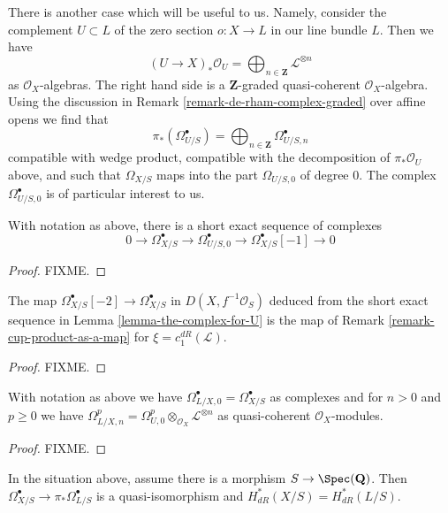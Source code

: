 \medskip\noindent
There is another case which will be useful to us. Namely, consider the
complement $U \subset L$ of the zero section $o : X \to L$ in our line
bundle $L$. Then we have
$$
(U \to X)_*\mathcal{O}_U =
\bigoplus\nolimits_{n \in \mathbf{Z}} \mathcal{L}^{\otimes n}
$$
as $\mathcal{O}_X$-algebras. The right hand side is a $\mathbf{Z}$-graded
quasi-coherent $\mathcal{O}_X$-algebra. Using the discussion in
Remark \ref{remark-de-rham-complex-graded} over affine opens we find that
$$
\pi_*(\Omega^\bullet_{U/S}) =
\bigoplus\nolimits_{n \in \mathbf{Z}} \Omega^\bullet_{U/S, n}
$$
compatible with wedge product, compatible with the decomposition
of $\pi_*\mathcal{O}_U$ above, and such that $\Omega_{X/S}$
maps into the part $\Omega_{U/S, 0}$ of degree $0$.
The complex $\Omega^\bullet_{U/S, 0}$ is of particular interest to us.

\begin{lemma}
\label{lemma-the-complex-for-U}
With notation as above, there is a short exact sequence of complexes
$$
0 \to \Omega^\bullet_{X/S} \to
\Omega^\bullet_{U/S, 0} \to
\Omega^\bullet_{X/S}[-1] \to 0
$$
\end{lemma}

\begin{proof}
FIXME.
\end{proof}

\begin{lemma}
\label{lemma-the-complex-for-U-gives-chern-class}
The map $\Omega^\bullet_{X/S}[-2] \to \Omega^\bullet_{X/S}$
in $D(X, f^{-1}\mathcal{O}_S)$ deduced
from the short exact sequence in Lemma \ref{lemma-the-complex-for-U}
is the map of Remark \ref{remark-cup-product-as-a-map}
for $\xi = c_1^{dR}(\mathcal{L})$.
\end{lemma}

\begin{proof}
FIXME.
\end{proof}

\begin{lemma}
\label{lemma-push-omega-a}
With notation as above we have
$\Omega^\bullet_{L/X, 0} = \Omega^\bullet_{X/S}$
as complexes and for $n > 0$ and $p \geq 0$ we have
$\Omega^p_{L/X, n} = \Omega^p_{U, 0} \otimes_{\mathcal{O}_X}
\mathcal{L}^{\otimes n}$
as quasi-coherent $\mathcal{O}_X$-modules.
\end{lemma}

\begin{proof}
FIXME.
\end{proof}

\begin{lemma}
\label{lemma-line-bundle-characteristic-zero}
In the situation above, assume there is a morphism $S \to \Spec(\mathbf{Q})$.
Then $\Omega^\bullet_{X/S} \to \pi_*\Omega^\bullet_{L/S}$ is a
quasi-isomorphism and $H_{dR}^*(X/S) = H_{dR}^*(L/S)$.
\end{lemma}

